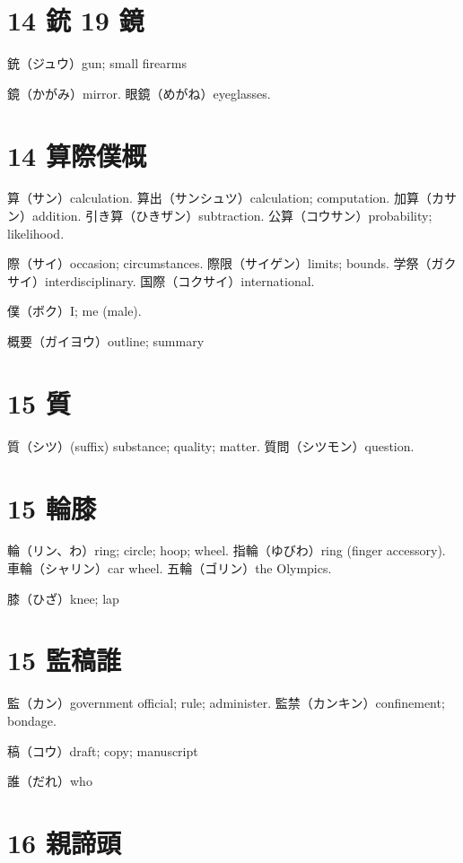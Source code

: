 \section{14 銃 19 鏡}

銃（ジュウ）gun; small firearms

鏡（かがみ）mirror.
眼鏡（めがね）eyeglasses.

\section{14 算際僕概}

算（サン）calculation.
算出（サンシュツ）calculation; computation.
加算（カサン）addition.
引き算（ひきザン）subtraction.
公算（コウサン）probability; likelihood.

際（サイ）occasion; circumstances.
際限（サイゲン）limits; bounds.
学祭（ガクサイ）interdisciplinary.
国際（コクサイ）international.

僕（ボク）I; me (male).

概要（ガイヨウ）outline; summary

\section{15 質}

質（シツ）(suffix) substance; quality; matter.
質問（シツモン）question.

\section{15 輪膝}

輪（リン、わ）ring; circle; hoop; wheel.
指輪（ゆびわ）ring (finger accessory).
車輪（シャリン）car wheel.
五輪（ゴリン）the Olympics.

膝（ひざ）knee; lap

\section{15 監稿誰}

監（カン）government official; rule; administer.
監禁（カンキン）confinement; bondage.

稿（コウ）draft; copy; manuscript

誰（だれ）who

\section{16 親諦頭}

